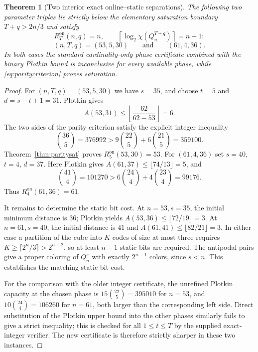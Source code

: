 \documentclass[11pt,a4paper]{article}
\newtheorem{theorem}{Theorem}[section]
\begin{document}
\begin{theorem}[Two interior exact online--static separations]\label{thm:interior}
The following two parameter triples lie strictly below the elementary saturation boundary $T+q>2n/3$ and satisfy
\[
\boxed{\ R_T^{\mathrm{on}}(n,q)=n,\qquad
\left\lceil\log_2\chi(Q_n^{T+q})\right\rceil=n-1:\ }
\]
\[
\boxed{(n,T,q)=(53,5,30)\qquad\text{and}\qquad(61,4,36).}
\]
In both cases the standard cardinality-only phase certificate combined with the binary Plotkin bound is inconclusive for every available phase, while \eqref{eq:paritycriterion} proves saturation.
\end{theorem}
\begin{proof}
For $(n,T,q)=(53,5,30)$ we have $s=35$, and choose $t=5$ and $d=s-t+1=31$. Plotkin gives
\[
 A(53,31)\le\left\lfloor\frac{62}{62-53}\right\rfloor=6.
\]
The two sides of the parity criterion satisfy the explicit integer inequality
\begin{equation}\label{eq:53}
\binom{36}{5}=376992>
9\binom{22}{5}+6\binom{21}{5}=359100.
\end{equation}
Theorem~\ref{thm:paritysat} proves $R_5^{\mathrm{on}}(53,30)=53$. For $(61,4,36)$ set $s=40$, $t=4$, $d=37$. Here Plotkin gives $A(61,37)\le\lfloor 74/13\rfloor=5$, and
\begin{equation}\label{eq:61}
\binom{41}{4}=101270>
6\binom{24}{4}+4\binom{23}{4}=99176.
\end{equation}
Thus $R_4^{\mathrm{on}}(61,36)=61$.

It remains to determine the static bit cost. At $n=53,s=35$, the initial minimum distance is $36$; Plotkin yields $A(53,36)\le\lfloor72/19\rfloor=3$. At $n=61,s=40$, the initial distance is $41$ and $A(61,41)\le\lfloor82/21\rfloor=3$. In either case a partition of the cube into $K$ codes of size at most three requires $K\ge\lceil2^n/3\rceil>2^{n-2}$, so at least $n-1$ static bits are required. The antipodal pairs give a proper coloring of $Q_n^s$ with exactly $2^{n-1}$ colors, since $s<n$. This establishes the matching static bit cost.

For the comparison with the older integer certificate, the unrefined Plotkin capacity at the chosen phase is $15\binom{22}{5}=395010$ for $n=53$, and $10\binom{24}{4}=106260$ for $n=61$, both larger than the corresponding left side. Direct substitution of the Plotkin upper bound into the other phases similarly fails to give a strict inequality; this is checked for all $1\le t\le T$ by the supplied exact-integer verifier. The new certificate is therefore strictly sharper in these two instances.
\end{proof}
\end{document}
